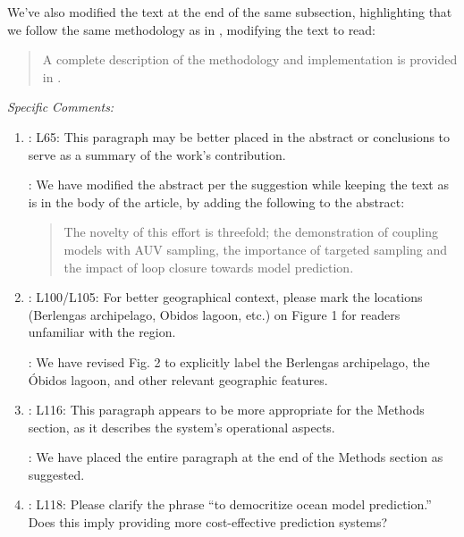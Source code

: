 \documentclass[a4paper]{article}
\begin{document}
\begin{answers}
\begin{enumerate}
We've also modified the text at the end of the same subsection,
highlighting that we follow the same methodology as in
\cite{duarte2025}, modifying the text to read:
  
\begin{quote}
  A complete description of the methodology and implementation is
  provided in \cite{duarte2025}. 
\end{quote}


\end{enumerate}
  
\item\label{sec:r1-spec} {\it Specific Comments:}

  \begin{enumerate}

  \item \reply: L65: This paragraph may be better placed in the
    abstract or conclusions to serve as a summary of the work’s
    contribution.

  \action: We have modified the abstract per the suggestion while
  keeping the text as is in the body of the article, by adding the
  following to the abstract:

  \begin{quote}
    
    The novelty of this effort is threefold; the demonstration of
    coupling models with AUV sampling, the importance of targeted
    sampling and the impact of loop closure towards model prediction.
  \end{quote}

\item \reply: L100/L105: For better geographical context, please mark
  the locations (Berlengas archipelago, Obidos lagoon, etc.) on Figure 1
  for readers unfamiliar with the region.

  \action: We have revised Fig. 2 to explicitly label the Berlengas
  archipelago, the \'{O}bidos lagoon, and other relevant geographic
  features.

\item \reply: L116: This paragraph appears to be more appropriate for
  the Methods section, as it describes the system’s operational aspects.

  \action: We have placed the entire paragraph at the end of the Methods
  section as suggested.

\item \reply: L118: Please clarify the phrase “to democritize ocean
  model prediction.” Does this imply providing more cost-effective
  prediction systems?


\end{enumerate}
\end{answers}
\end{document}
